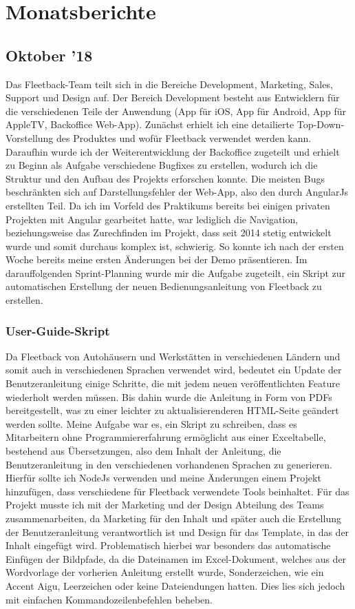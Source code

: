 \documentclass[a4paper, 11pt]{article}
\begin{document}
\section{Monatsberichte}
\subsection{Oktober '18}
Das Fleetback-Team teilt sich in die Bereiche Development, Marketing, Sales, Support und Design auf. Der Bereich Development besteht aus Entwicklern für die verschiedenen Teile der Anwendung (App für iOS, App für Android, App für AppleTV, Backoffice Web-App). Zunächst erhielt ich eine detailierte Top-Down-Vorstellung des Produktes und wofür Fleetback verwendet werden kann. Daraufhin wurde ich der Weiterentwicklung der Backoffice zugeteilt und erhielt zu Beginn als Aufgabe verschiedene Bugfixes zu erstellen, wodurch ich die Struktur und den Aufbau des Projekts erforschen konnte. Die meisten Bugs beschränkten sich auf Darstellungsfehler der Web-App, also den durch AngularJs erstellten Teil. Da ich im Vorfeld des Praktikums bereits bei einigen privaten Projekten mit Angular gearbeitet hatte, war lediglich die Navigation, beziehungsweise das Zurechfinden im Projekt, dass seit 2014 stetig entwickelt wurde und somit durchaus komplex ist, schwierig.  So konnte ich nach der ersten Woche bereits meine ersten Änderungen bei der Demo präsentieren. Im darauffolgenden Sprint-Planning wurde mir die Aufgabe zugeteilt, ein Skript zur automatischen Erstellung der neuen Bedienungsanleitung von Fleetback zu erstellen.

\subsubsection{User-Guide-Skript}
Da Fleetback von Autohäusern und Werkstätten in verschiedenen Ländern und somit auch in verschiedenen Sprachen verwendet wird, bedeutet ein Update der Benutzeranleitung einige Schritte, die mit jedem neuen veröffentlichten Feature wiederholt werden müssen. Bis dahin wurde die Anleitung in Form von PDFs bereitgestellt, was zu einer leichter zu aktualisierenderen HTML-Seite geändert werden sollte. Meine Aufgabe war es, ein Skript zu schreiben, dass es Mitarbeitern ohne Programmiererfahrung ermöglicht aus einer Exceltabelle, bestehend aus Übersetzungen, also dem Inhalt der Anleitung, die Benutzeranleitung in den verschiedenen vorhandenen Sprachen zu generieren. Hierfür sollte ich NodeJs verwenden und meine Änderungen einem Projekt hinzufügen, dass verschiedene für Fleetback verwendete Tools beinhaltet. Für das Projekt musste ich mit der Marketing und der Design Abteilung des Teams zusammenarbeiten, da Marketing für den Inhalt und später auch die Erstellung der Benutzeranleitung verantwortlich ist und Design für das Template, in das der Inhalt eingefügt wird. Problematisch hierbei war besonders das automatische Einfügen der Bildpfade, da die Dateinamen im Excel-Dokument, welches aus der Wordvorlage der vorherien Anleitung erstellt wurde, Sonderzeichen, wie ein Accent Aigu, Leerzeichen oder keine Dateiendungen hatten. Dies lies sich jedoch mit einfachen Kommandozeilenbefehlen beheben.
\end{document}
